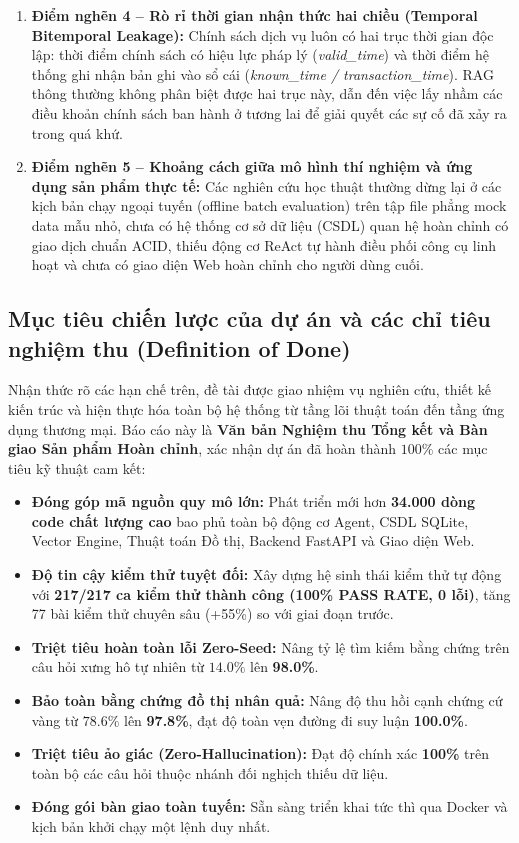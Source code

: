 \documentclass[a4paper,11pt]{article}
\begin{document}
\begin{enumerate}[leftmargin=1.8em,topsep=2pt]
    \item \textbf{Điểm nghẽn 4 -- Rò rỉ thời gian nhận thức hai chiều (Temporal Bitemporal Leakage):}
    Chính sách dịch vụ luôn có hai trục thời gian độc lập: thời điểm chính sách có hiệu lực pháp lý (\textit{valid\_time}) và thời điểm hệ thống ghi nhận bản ghi vào sổ cái (\textit{known\_time / transaction\_time}). RAG thông thường không phân biệt được hai trục này, dẫn đến việc lấy nhầm các điều khoản chính sách ban hành ở tương lai để giải quyết các sự cố đã xảy ra trong quá khứ.
    \item \textbf{Điểm nghẽn 5 -- Khoảng cách giữa mô hình thí nghiệm và ứng dụng sản phẩm thực tế:}
    Các nghiên cứu học thuật thường dừng lại ở các kịch bản chạy ngoại tuyến (offline batch evaluation) trên tập file phẳng mock data mẫu nhỏ, chưa có hệ thống cơ sở dữ liệu (CSDL) quan hệ hoàn chỉnh có giao dịch chuẩn ACID, thiếu động cơ ReAct tự hành điều phối công cụ linh hoạt và chưa có giao diện Web hoàn chỉnh cho người dùng cuối.
\end{enumerate}

\subsection{Mục tiêu chiến lược của dự án và các chỉ tiêu nghiệm thu (Definition of Done)}
Nhận thức rõ các hạn chế trên, đề tài được giao nhiệm vụ nghiên cứu, thiết kế kiến trúc và hiện thực hóa toàn bộ hệ thống từ tầng lõi thuật toán đến tầng ứng dụng thương mại. Báo cáo này là \textbf{Văn bản Nghiệm thu Tổng kết và Bàn giao Sản phẩm Hoàn chỉnh}, xác nhận dự án đã hoàn thành $100\%$ các mục tiêu kỹ thuật cam kết:
\begin{itemize}[leftmargin=1.5em,topsep=2pt]
    \item \textbf{Đóng góp mã nguồn quy mô lớn:} Phát triển mới hơn \textbf{34.000 dòng code chất lượng cao} bao phủ toàn bộ động cơ Agent, CSDL SQLite, Vector Engine, Thuật toán Đồ thị, Backend FastAPI và Giao diện Web.
    \item \textbf{Độ tin cậy kiểm thử tuyệt đối:} Xây dựng hệ sinh thái kiểm thử tự động với \textbf{217/217 ca kiểm thử thành công (100\% PASS RATE, 0 lỗi)}, tăng 77 bài kiểm thử chuyên sâu (+55\%) so với giai đoạn trước.
    \item \textbf{Triệt tiêu hoàn toàn lỗi Zero-Seed:} Nâng tỷ lệ tìm kiếm bằng chứng trên câu hỏi xưng hô tự nhiên từ $14.0\%$ lên \textbf{98.0\%}.
    \item \textbf{Bảo toàn bằng chứng đồ thị nhân quả:} Nâng độ thu hồi cạnh chứng cứ vàng từ $78.6\%$ lên \textbf{97.8\%}, đạt độ toàn vẹn đường đi suy luận \textbf{100.0\%}.
    \item \textbf{Triệt tiêu ảo giác (Zero-Hallucination):} Đạt độ chính xác \textbf{100\%} trên toàn bộ các câu hỏi thuộc nhánh đối nghịch thiếu dữ liệu.
    \item \textbf{Đóng gói bàn giao toàn tuyến:} Sẵn sàng triển khai tức thì qua Docker và kịch bản khởi chạy một lệnh duy nhất.
\end{itemize}
\end{document}
